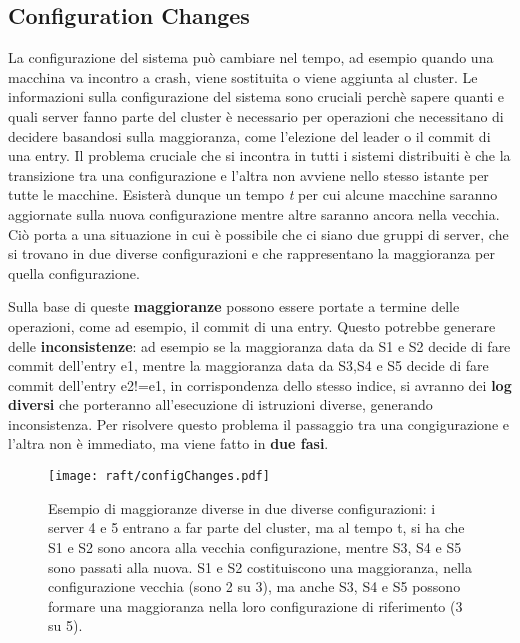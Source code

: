 \subsection{Configuration Changes}
La configurazione del sistema può cambiare nel tempo, ad esempio quando una macchina va incontro a crash, viene sostituita o viene aggiunta al cluster.
Le informazioni sulla configurazione del sistema sono cruciali perchè sapere quanti e quali server fanno parte del cluster è necessario per operazioni che necessitano di decidere basandosi sulla maggioranza, come l'elezione del leader o il commit di una entry.
Il problema cruciale che si incontra in tutti i sistemi distribuiti è che la transizione tra una configurazione e l'altra non avviene nello stesso istante per tutte le macchine. Esisterà dunque un tempo \textit{t} per cui alcune macchine saranno aggiornate sulla nuova configurazione mentre altre saranno ancora nella vecchia. Ciò porta a una situazione in cui è possibile che ci siano due gruppi di server, che si trovano in due diverse configurazioni e che rappresentano la maggioranza per quella configurazione.

Sulla base di queste \textbf{maggioranze} possono essere portate a termine delle operazioni, come ad esempio, il commit  di una entry. Questo potrebbe generare delle \textbf{inconsistenze}: ad esempio se la maggioranza data da S1 e S2 decide di fare commit dell'entry e1, mentre la maggioranza data da S3,S4 e S5 decide di fare commit dell'entry e2!=e1, in corrispondenza dello stesso indice, si avranno dei \textbf{log diversi} che porteranno all'esecuzione di istruzioni diverse, generando inconsistenza.
Per risolvere questo problema il passaggio tra una congigurazione e l'altra non è immediato, ma viene fatto in \textbf{due fasi}.

  \begin{figure}[H]
    \centering
    \texttt{[image: raft/configChanges.pdf]}
    \caption{Esempio di maggioranze diverse in due diverse configurazioni: i server 4 e 5 entrano a far parte del cluster, ma al tempo t, si ha che S1 e S2 sono ancora alla vecchia configurazione, mentre S3, S4 e S5 sono passati alla nuova.
S1 e S2 costituiscono una maggioranza, nella configurazione vecchia (sono 2 su 3), ma anche S3, S4 e S5 possono formare una maggioranza nella loro configurazione di riferimento (3 su 5). }
    \label{fig:figure 8}
  \end{figure}




